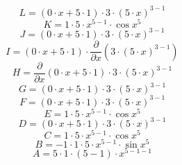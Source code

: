 \documentclass[12pt]{article}
\begin{document}
\begin{equation}
	L = 
\left( 0\cdot x + 5\cdot 1\right) \cdot 3\cdot \left( 5\cdot x\right) ^{3 - 1}
\end{equation}
\begin{equation}
	K = 
1\cdot 5\cdot x^{5 - 1}\cdot \cos {x^{5}}
\end{equation}
\begin{equation}
	J = 
\left( 0\cdot x + 5\cdot 1\right) \cdot 3\cdot \left( 5\cdot x\right) ^{3 - 1}
\end{equation}
\begin{equation}
	I = 
\left( 0\cdot x + 5\cdot 1\right) \cdot \frac{\partial}{\partial x}\left( 3\cdot \left( 5\cdot x\right) ^{3 - 1}\right) 
\end{equation}
\begin{equation}
	H = 
\frac{\partial}{\partial x}\left( 0\cdot x + 5\cdot 1\right) \cdot 3\cdot \left( 5\cdot x\right) ^{3 - 1}
\end{equation}
\begin{equation}
	G = 
\left( 0\cdot x + 5\cdot 1\right) \cdot 3\cdot \left( 5\cdot x\right) ^{3 - 1}
\end{equation}
\begin{equation}
	F = 
\left( 0\cdot x + 5\cdot 1\right) \cdot 3\cdot \left( 5\cdot x\right) ^{3 - 1}
\end{equation}
\begin{equation}
	E = 
1\cdot 5\cdot x^{5 - 1}\cdot \cos {x^{5}}
\end{equation}
\begin{equation}
	D = 
\left( 0\cdot x + 5\cdot 1\right) \cdot 3\cdot \left( 5\cdot x\right) ^{3 - 1}
\end{equation}
\begin{equation}
	C = 
1\cdot 5\cdot x^{5 - 1}\cdot \cos {x^{5}}
\end{equation}
\begin{equation}
	B = 
-1\cdot 1\cdot 5\cdot x^{5 - 1}\cdot \sin {x^{5}}
\end{equation}
\begin{equation}
	A = 
5\cdot 1\cdot \left( 5 - 1\right) \cdot x^{5 - 1 - 1}
\end{equation}
\end{document}
